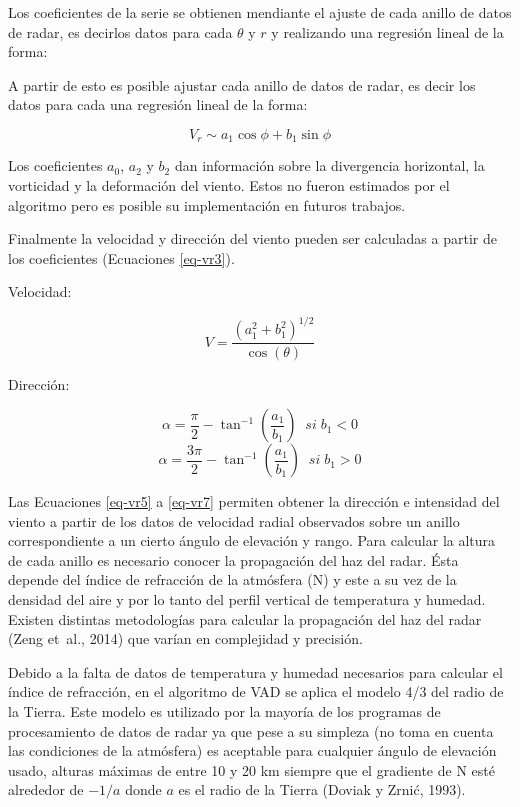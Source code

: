 \documentclass[12pt,spanish,oneside, a4paper]{book}
\begin{document}
Los coeficientes de la serie se obtienen mendiante el ajuste de cada
anillo de datos de radar, es decirlos datos para cada \(\theta\) y \(r\)
y realizando una regresión lineal de la forma:

A partir de esto es posible ajustar cada anillo de datos de radar, es
decir los datos para cada una regresión lineal de la forma:

\begin{equation}
\label{eq-vr4}
V_r \sim a_1\cos \phi + b_1 \sin \phi
\end{equation}

Los coeficientes \(a_0\), \(a_2\) y \(b_2\) dan información sobre la
divergencia horizontal, la vorticidad y la deformación del viento. Estos
no fueron estimados por el algoritmo pero es posible su implementación
en futuros trabajos.

Finalmente la velocidad y dirección del viento pueden ser calculadas a
partir de los coeficientes (Ecuaciones \ref{eq-vr3}).

Velocidad:

\begin{equation}
\label{eq-vr5}
V = \frac{(a_{1}^{2} + b_{1}^{2})^{1/2}}{\cos(\theta)}
\end{equation}

Dirección:

\begin{equation}\label{eq-vr6}
\alpha = \frac{\pi}{2}-\tan^{-1}(\frac{a_1}{b_1}) \; \; si \; b_1 < 0 
\end{equation}\begin{equation}\label{eq-vr7}
\alpha = \frac{3\pi}{2}-\tan^{-1}(\frac{a_1}{b_1}) \; \; si \; b_1 > 0
\end{equation}

Las Ecuaciones \ref{eq-vr5} a \ref{eq-vr7} permiten obtener la dirección
e intensidad del viento a partir de los datos de velocidad radial
observados sobre un anillo correspondiente a un cierto ángulo de
elevación y rango. Para calcular la altura de cada anillo es necesario
conocer la propagación del haz del radar. Ésta depende del índice de
refracción de la atmósfera (N) y este a su vez de la densidad del aire y
por lo tanto del perfil vertical de temperatura y humedad. Existen
distintas metodologías para calcular la propagación del haz del radar
(Zeng et~al., 2014) que varían en complejidad y precisión.

Debido a la falta de datos de temperatura y humedad necesarios para
calcular el índice de refracción, en el algoritmo de VAD se aplica el
modelo 4/3 del radio de la Tierra. Este modelo es utilizado por la
mayoría de los programas de procesamiento de datos de radar ya que pese
a su simpleza (no toma en cuenta las condiciones de la atmósfera) es
aceptable para cualquier ángulo de elevación usado, alturas máximas de
entre 10 y 20 km siempre que el gradiente de N esté alrededor de
\(-1/a\) donde \(a\) es el radio de la Tierra (Doviak y Zrnić, 1993).
\end{document}
